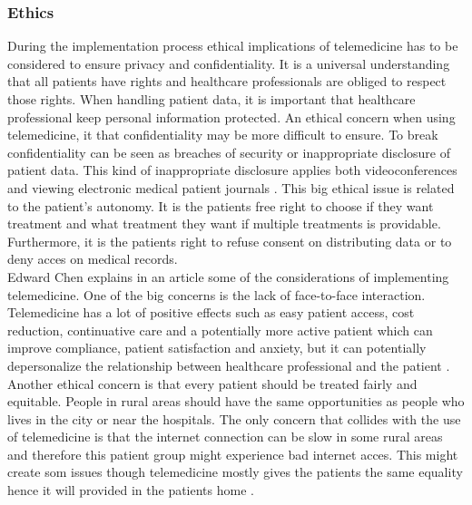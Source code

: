 \subsubsection{Ethics}

During the implementation process ethical implications of telemedicine has to be considered to ensure privacy and confidentiality. It is a universal understanding that all patients have rights and healthcare professionals are obliged to respect those rights. When handling patient data, it is important that healthcare professional keep personal information protected. An ethical concern when using telemedicine, it that confidentiality may be more difficult to ensure. To break confidentiality can be seen as breaches of security or inappropriate disclosure of patient data. This kind of inappropriate disclosure applies both videoconferences and viewing electronic medical patient journals \cite{etik}. This big ethical issue is related to the patient's autonomy. It is the patients free right to choose if they want treatment and what treatment they want if multiple treatments is providable. Furthermore, it is the patients right to refuse consent on distributing data or to deny acces on medical records. \\

Edward Chen explains in an article some of the considerations of implementing telemedicine. One of the big concerns is the lack of face-to-face interaction. Telemedicine has a lot of positive effects such as easy patient access, cost reduction, continuative care and a potentially more active patient which can improve compliance, patient satisfaction and anxiety, but it can potentially depersonalize the relationship between healthcare professional and the patient \cite{considerations}.\\ 

Another ethical concern is that every patient should be treated fairly and equitable. People in rural areas should have the same opportunities as people who lives in the city or near the hospitals. The only concern that collides with the use of telemedicine is that the internet connection can be slow in some rural areas and therefore this patient group might experience bad internet acces. This might create som issues though telemedicine mostly gives the patients the same equality hence it will provided in the patients home \cite{considerations}. 

